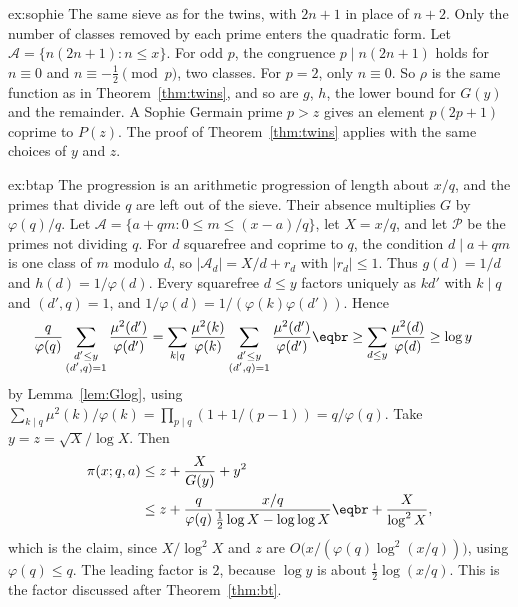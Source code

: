 \begin{solution}{ex:sophie}
\idea The same sieve as for the twins, with $2n+1$ in place of $n+2$. Only the number of classes removed by each prime enters the quadratic form.
\writeup Let $\mathcal A=\{n(2n+1):n\le x\}$. For odd $p$, the congruence $p\mid n(2n+1)$ holds for $n\equiv0$ and $n\equiv-\frac12\pmod p$, two classes. For $p=2$, only $n\equiv0$. So $\rho$ is the same function as in Theorem~\ref{thm:twins}, and so are $g$, $h$, the lower bound for $G(y)$ and the remainder. A Sophie Germain prime $p>z$ gives an element $p(2p+1)$ coprime to $P(z)$. The proof of Theorem~\ref{thm:twins} applies with the same choices of $y$ and $z$.
\end{solution}

\begin{solution}{ex:btap}
\idea The progression is an arithmetic progression of length about $x/q$, and the primes that divide $q$ are left out of the sieve. Their absence multiplies $G$ by $\varphi(q)/q$.
\writeup Let $\mathcal A=\{a+qm:0\le m\le(x-a)/q\}$, let $X=x/q$, and let $\mathcal P$ be the primes not dividing $q$. For $d$ squarefree and coprime to $q$, the condition $d\mid a+qm$ is one class of $m$ modulo $d$, so $|\mathcal A_d|=X/d+r_d$ with $|r_d|\le1$. Thus $g(d)=1/d$ and $h(d)=1/\varphi(d)$. Every squarefree $d\le y$ factors uniquely as $kd'$ with $k\mid q$ and $(d',q)=1$, and $1/\varphi(d)=1/(\varphi(k)\varphi(d'))$. Hence
\[
\begin{aligned}\frac q{\varphi(q)}\sum_{\substack{d'\le y\\(d',q)=1}}\frac{\mu^2(d')}{\varphi(d')}&=\sum_{k\mid q}\frac{\mu^2(k)}{\varphi(k)}\sum_{\substack{d'\le y\\(d',q)=1}}\frac{\mu^2(d')}{\varphi(d')}\eqbr\ge\sum_{d\le y}\frac{\mu^2(d)}{\varphi(d)}\ge\log y\end{aligned}
\]
by Lemma~\ref{lem:Glog}, using $\sum_{k\mid q}\mu^2(k)/\varphi(k)=\prod_{p\mid q}(1+1/(p-1))=q/\varphi(q)$. Take $y=z=\sqrt X/\log X$. Then
\[
\begin{aligned}\pi(x;q,a)&\le z+\frac{X}{G(y)}+y^2\\&\le z+\frac q{\varphi(q)}\frac{x/q}{\frac12\log X-\log\log X}\eqbr+\frac X{\log^2X},\end{aligned}
\]
which is the claim, since $X/\log^2X$ and $z$ are $O\bigl(x/(\varphi(q)\log^2(x/q))\bigr)$, using $\varphi(q)\le q$. The leading factor is $2$, because $\log y$ is about $\frac12\log(x/q)$. This is the factor discussed after Theorem~\ref{thm:bt}.
\end{solution}

